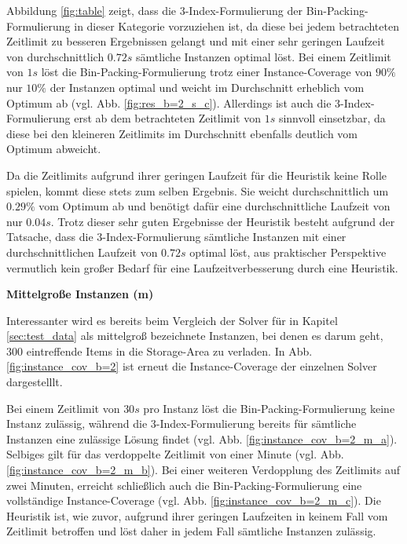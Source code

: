 Abbildung \ref{fig:table} zeigt, dass die 3-Index-Formulierung der Bin-Packing-Formulierung in dieser Kategorie vorzuziehen ist,
da diese bei jedem betrachteten Zeitlimit zu besseren Ergebnissen gelangt und mit einer sehr geringen Laufzeit
von durchschnittlich $0.72s$ sämtliche Instanzen optimal löst. Bei einem Zeitlimit von $1s$ löst die Bin-Packing-Formulierung trotz einer Instance-Coverage von $90 \%$ nur $10 \%$ der Instanzen optimal und weicht im Durchschnitt erheblich vom Optimum ab (vgl. Abb. \ref{fig:res_b=2_s_c}).
Allerdings ist auch die 3-Index-Formulierung erst ab dem betrachteten Zeitlimit von $1s$ sinnvoll einsetzbar,
da diese bei den kleineren Zeitlimits im Durchschnitt ebenfalls deutlich vom Optimum abweicht.

Da die Zeitlimits aufgrund ihrer geringen Laufzeit für die Heuristik keine Rolle spielen, kommt diese stets zum selben Ergebnis. Sie weicht durchschnittlich um $0.29 \%$ vom Optimum ab und benötigt dafür eine durchschnittliche Laufzeit von nur $0.04s$.
Trotz dieser sehr guten Ergebnisse der Heuristik besteht aufgrund der Tatsache, dass die 3-Index-Formulierung sämtliche Instanzen
mit einer durchschnittlichen Laufzeit von $0.72s$ optimal löst, aus praktischer Perspektive vermutlich kein großer Bedarf für
eine Laufzeitverbesserung durch eine Heuristik.

\vfill
\pagebreak

\textbf{Mittelgroße Instanzen (m)}

Interessanter wird es bereits beim Vergleich der Solver für in Kapitel \ref{sec:test_data} als mittelgroß bezeichnete Instanzen,
bei denen es darum geht, $300$ eintreffende Items in die Storage-Area zu verladen.
In Abb. \ref{fig:instance_cov_b=2} ist erneut die Instance-Coverage der einzelnen Solver dargestelllt.

Bei einem Zeitlimit von $30s$ pro Instanz löst die Bin-Packing-Formulierung keine Instanz zulässig, während die 3-Index-Formulierung bereits für sämtliche Instanzen eine zulässige Lösung findet (vgl. Abb. \ref{fig:instance_cov_b=2_m_a}).
Selbiges gilt für das verdoppelte Zeitlimit von einer Minute (vgl. Abb. \ref{fig:instance_cov_b=2_m_b}). Bei einer weiteren
Verdopplung des Zeitlimits auf zwei Minuten, erreicht schließlich auch die Bin-Packing-Formulierung eine vollständige Instance-Coverage (vgl. Abb. \ref{fig:instance_cov_b=2_m_c}). Die Heuristik ist, wie zuvor, aufgrund ihrer geringen Laufzeiten
in keinem Fall vom Zeitlimit betroffen und löst daher in jedem Fall sämtliche Instanzen zulässig.

